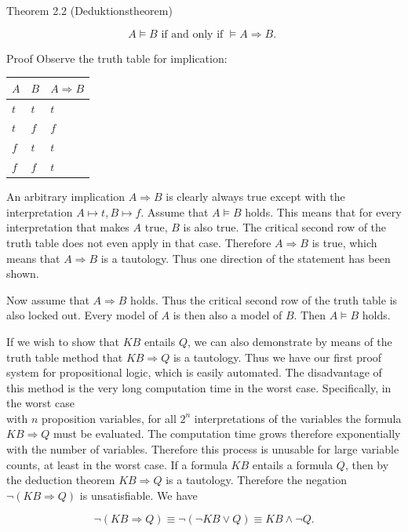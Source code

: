 \documentclass[10pt]{book}
\begin{document}
Theorem 2.2 (Deduktionstheorem)

$$
A \models B \text { if and only if } \models A \Rightarrow B \text {. }
$$

Proof Observe the truth table for implication:

\begin{center}
\begin{tabular}{lll}
\hline
$A$ & $B$ & $A \Rightarrow B$ \\
\hline
$t$ & $t$ & $t$ \\
\hline
$t$ & $f$ & $f$ \\
\hline
$f$ & $t$ & $t$ \\
\hline
$f$ & $f$ & $t$ \\
\hline
\end{tabular}
\end{center}

An arbitrary implication $A \Rightarrow B$ is clearly always true except with the interpretation $A \longmapsto t, B \longmapsto f$. Assume that $A \models B$ holds. This means that for every interpretation that makes $A$ true, $B$ is also true. The critical second row of the truth table does not even apply in that case. Therefore $A \Rightarrow B$ is true, which means that $A \Rightarrow B$ is a tautology. Thus one direction of the statement has been shown.

Now assume that $A \Rightarrow B$ holds. Thus the critical second row of the truth table is also locked out. Every model of $A$ is then also a model of $B$. Then $A \models B$ holds.

If we wish to show that $K B$ entails $Q$, we can also demonstrate by means of the truth table method that $K B \Rightarrow Q$ is a tautology. Thus we have our first proof system for propositional logic, which is easily automated. The disadvantage of this method is the very long computation time in the worst case. Specifically, in the worst case\\
with $n$ proposition variables, for all $2^{n}$ interpretations of the variables the formula $K B \Rightarrow Q$ must be evaluated. The computation time grows therefore exponentially with the number of variables. Therefore this process is unusable for large variable counts, at least in the worst case.
If a formula $K B$ entails a formula $Q$, then by the deduction theorem $K B \Rightarrow Q$ is a tautology. Therefore the negation $\neg(K B \Rightarrow Q)$ is unsatisfiable. We have

$$
\neg(K B \Rightarrow Q) \equiv \neg(\neg K B \vee Q) \equiv K B \wedge \neg Q .
$$
\end{document}
